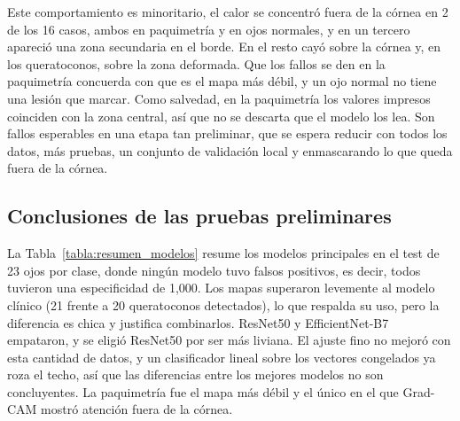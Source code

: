         Este comportamiento es minoritario, el calor se concentró fuera de la córnea en 2 de los 16 casos, ambos en paquimetría y en ojos normales, y en un tercero apareció una zona secundaria en el borde. En el resto cayó sobre la córnea y, en los queratoconos, sobre la zona deformada. Que los fallos se den en la paquimetría concuerda con que es el mapa más débil, y un ojo normal no tiene una lesión que marcar. Como salvedad, en la paquimetría los valores impresos coinciden con la zona central, así que no se descarta que el modelo los lea. Son fallos esperables en una etapa tan preliminar, que se espera reducir con todos los datos, más pruebas, un conjunto de validación local y enmascarando lo que queda fuera de la córnea.

    \subsection{Conclusiones de las pruebas preliminares}

        La Tabla~\ref{tabla:resumen_modelos} resume los modelos principales en el test de 23 ojos por clase, donde ningún modelo tuvo falsos positivos, es decir, todos tuvieron una especificidad de 1,000. Los mapas superaron levemente al modelo clínico (21 frente a 20 queratoconos detectados), lo que respalda su uso, pero la diferencia es chica y justifica combinarlos. ResNet50 y EfficientNet-B7 empataron, y se eligió ResNet50 por ser más liviana. El ajuste fino no mejoró con esta cantidad de datos, y un clasificador lineal sobre los vectores congelados ya roza el techo, así que las diferencias entre los mejores modelos no son concluyentes. La paquimetría fue el mapa más débil y el único en el que Grad-CAM mostró atención fuera de la córnea.

